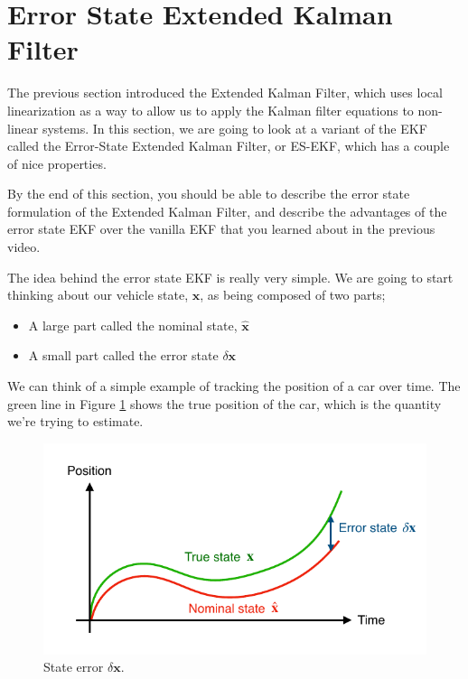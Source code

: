 \section{Error State Extended Kalman Filter}
\label{error_state_extended_kalman_filter}

The previous section introduced the Extended
Kalman Filter, which uses local linearization as a way to allow us to apply the Kalman
filter equations to non-linear systems. In this section, we are going to look
at a variant of the EKF called the Error-State Extended
Kalman Filter, or ES-EKF, which has a couple of nice properties. 

By the end of this section, you should be able to describe the error state
formulation of the Extended Kalman Filter, and describe the advantages of the error state EKF
over the vanilla EKF that you learned about in the
previous video. 

The idea behind
the error state EKF is really very simple. We are going to start thinking about our vehicle state, $\mathbf{x}$, as being composed
of two parts; 

\begin{itemize}
\item A large part called the nominal state, $\hat{\mathbf{x}}$
\item A small part called the error state $\delta \mathbf{x}$
\end{itemize}

We can think of a simple example of tracking the position of a car over time. The green line in Figure \ref{es_extended_kalman_filter_1} shows the true position
of the car, which is the quantity we're trying to estimate. 

\begin{figure}[!htb]
\begin{center}
\includegraphics[scale=0.280]{img/kalman_filter/es_extended_kalman_filter_1.jpeg}
\end{center}
\caption{State error $\delta \mathbf{x}$.}
\label{es_extended_kalman_filter_1}
\end{figure}

